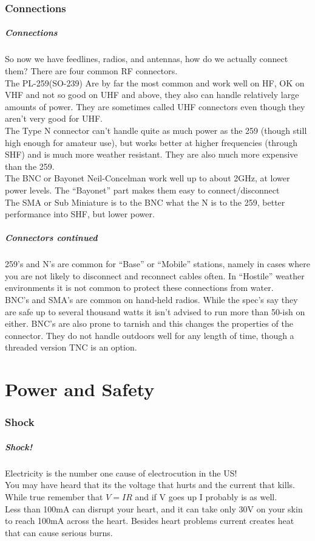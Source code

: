 \documentclass[10pt]{beamer}
\begin{document}
\section{Connections}
\begin{frame}
\frametitle{Connections}
So now we have feedlines, radios, and antennas, how do we actually connect them? There are four common RF connectors.\pause\\
The PL-259(SO-239) Are by far the most common and work well on HF, OK on VHF and not so good on UHF and above, they also can handle relatively large amounts of power. They are sometimes called UHF connectors even though they aren't very good for UHF. \pause \\
The Type N connector can't handle quite as much power as the 259 (though still high enough for amateur use), but works better at higher frequencies (through SHF) and is much more weather resistant. They are also much more expensive than the 259. \pause \\
The BNC or Bayonet Neil-Concelman work well up to about 2GHz, at lower power levels. The ``Bayonet'' part makes them easy to connect/disconnect \pause \\
The SMA or Sub Miniature is to the BNC what the N is to the 259, better performance into SHF, but lower power.

\end{frame}

\begin{frame}
\frametitle{Connectors continued}
259's and N's are common for ``Base'' or ``Mobile'' stations, namely in cases where you are not likely to disconnect and reconnect cables often. In ``Hostile'' weather environments it is not common to protect these connections from water.\\
BNC's and SMA's are common on hand-held radios. While the spec's say they are safe up to several thousand watts it isn't advised to run more than 50-ish on either. BNC's are also prone to tarnish and this changes the properties of the connector. They do not handle outdoors well for any length of time, though a threaded version TNC is an option.
\end{frame}

\part{Power and Safety}
\section{Shock}
\begin{frame}
\frametitle{Shock!}
Electricity is the number one cause of electrocution in the US!\\
You may have heard that its the voltage that hurts and the current that kills. While true remember that $V=IR$ and if V goes up I probably is as well.\\
Less than 100mA can disrupt your heart, and it can take only 30V on your skin to reach 100mA across the heart.
Besides heart problems current creates heat that can cause serious burns.
\end{frame}
\end{document}
